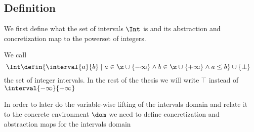 \subsection{Definition}
\label{sub:intervals}

We first define what the set of intervals \(\Int\) is and its
abstraction and concretization map to the powerset of integers.

\begin{definition}\label{def:int}
  We call
  \begin{equation*}
    \Int \defin \{ \interval{a}{b} \mid a \in \z \cup \{-\infty\}
    \wedge b \in \z \cup \{+\infty\} \wedge a\leq b \} \cup
    \{\bot\} 
  \end{equation*}
  the set of integer intervals. In the rest of the thesis we will
  write \(\top\) instead of \(\interval{-\infty}{+\infty}\)
\end{definition}

In order to later do the variable-wise lifting of the intervals domain
and relate it to the concrete environment \(\dom\) we need to define
concretization and abstraction maps for the intervals domain

